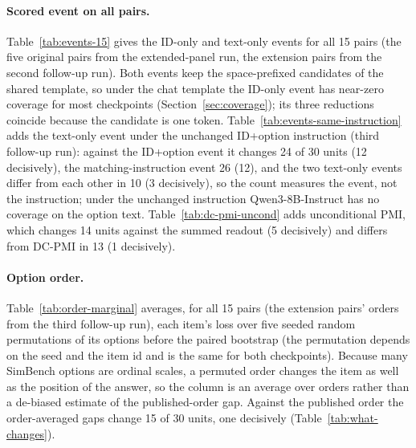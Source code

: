 \documentclass[11pt]{article}
\begin{document}
\paragraph{Scored event on all pairs.}
Table~\ref{tab:events-15} gives the ID-only and text-only events for all 15
pairs (the five original pairs from the extended-panel run, the extension
pairs from the second follow-up run). Both events keep the space-prefixed
candidates of the shared template, so under the chat template the ID-only
event has near-zero coverage for most checkpoints (Section~\ref{sec:coverage});
its three reductions coincide because the candidate is one token. Table~\ref{tab:events-same-instruction} adds the text-only event under the unchanged ID+option instruction (third follow-up run): against the ID+option event it changes 24 of 30 units (12 decisively), the matching-instruction event 26 (12), and the two text-only events differ from each other in 10 (3 decisively), so the count measures the event, not the instruction; under the unchanged instruction Qwen3-8B-Instruct has no coverage on the option text. Table~\ref{tab:dc-pmi-uncond} adds unconditional PMI, which changes 14 units against the summed readout (5 decisively) and differs from DC-PMI in 13 (1 decisively).

\paragraph{Option order.}
Table~\ref{tab:order-marginal} averages, for all 15 pairs (the extension pairs' orders from the third follow-up run), each item's loss over five seeded random permutations of its options before the paired bootstrap (the
permutation depends on the seed and the item id and is the same for both
checkpoints). Because many SimBench options are ordinal scales, a permuted
order changes the item as well as the position of the answer, so the column
is an average over orders rather than a de-biased estimate of the published-order gap. Against the published order the order-averaged gaps change 15 of 30 units, one decisively (Table~\ref{tab:what-changes}).
\end{document}
